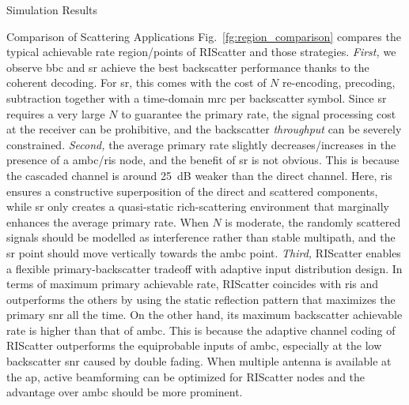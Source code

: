 \begin{section}{Simulation Results}
\begin{subsection}{Comparison of Scattering Applications}
		Fig.~\ref{fg:region_comparison} compares the typical achievable rate region/points of RIScatter and those strategies.
		\emph{First,} we observe \gls{bbc} and \gls{sr} achieve the best backscatter performance thanks to the coherent decoding.
		For \gls{sr}, this comes with the cost of $N$ re-encoding, precoding, subtraction together with a time-domain \gls{mrc} per backscatter symbol.
		Since \gls{sr} requires a very large $N$ to guarantee the primary rate, the signal processing cost at the receiver can be prohibitive, and the backscatter \emph{throughput} can be severely constrained.
		\emph{Second,} the average primary rate slightly decreases/increases in the presence of a \gls{ambc}/\gls{ris} node, and the benefit of \gls{sr} is not obvious.
		This is because the cascaded channel is around \qty{25}{dB} weaker than the direct channel.
		Here, \gls{ris} ensures a constructive superposition of the direct and scattered components, while \gls{sr} only creates a quasi-static rich-scattering environment that marginally enhances the average primary rate.
		When $N$ is moderate, the randomly scattered signals should be modelled as interference rather than stable multipath, and the \gls{sr} point should move vertically towards the \gls{ambc} point.
		\emph{Third,} RIScatter enables a flexible primary-backscatter tradeoff with adaptive input distribution design.
		In terms of maximum primary achievable rate, RIScatter coincides with \gls{ris} and outperforms the others by using the static reflection pattern that maximizes the primary \gls{snr} all the time.
		On the other hand, its maximum backscatter achievable rate is higher than that of \gls{ambc}.
		This is because the adaptive channel coding of RIScatter outperforms the equiprobable inputs of \gls{ambc}, especially at the low backscatter \gls{snr} caused by double fading.
		When multiple antenna is available at the \gls{ap}, active beamforming can be optimized for RIScatter nodes and the advantage over \gls{ambc} should be more prominent.
	\end{subsection}


\end{section}
